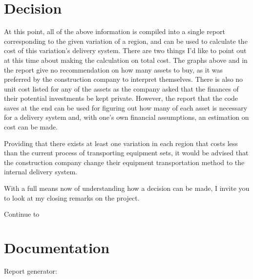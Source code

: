 \documentclass[letterpaper,10pt,english]{sphinxmanual}
\begin{document}
\noindent{}

\noindent{}


\section{Decision}
\label{\detokenize{reporting:decision}}
At this point, all of the above information is compiled into a single report
corresponding to the given variation of a region, and can be used to calculate
the cost of this variation's delivery system. There are two things I'd like to
point out at this time about making the calculation on total cost. The graphs
above and in the report give no recommendation on how many assets to buy, as
it was preferred by the construction company to interpret themselves. There is
also no unit cost listed for any of the assets as the company asked that the
finances of their potential investments be kept private. However, the report
that the code saves at the end can be used for figuring out how many of each
asset is necessary for a delivery system and, with one's own financial
assumptions, an estimation on cost can be made.

Providing that there exists at least one variation in each region that costs
less than the current process of transporting equipment sets, it would be
advised that the construction company change their equipment transportation
method to the internal delivery system.

With a full means now of understanding how a decision can be made, I invite
you to look at my closing remarks on the project.

Continue to {\hyperref[\detokenize{conclusion:conclusion}]{}}


\section{Documentation}
\label{\detokenize{reporting:documentation}}
Report generator:
\end{document}
